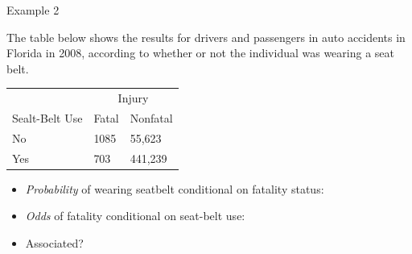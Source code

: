 \documentclass{beamer}
\begin{document}
\begin{frame}{Example 2}

{\scriptsize The table below shows the results for drivers and passengers in auto accidents in Florida in 2008, according to whether or not the individual was wearing a seat belt.}

\begin{center}
\begin{tabular}{|p{3cm}|p{3cm}|p{3cm}|}
\hline
 & \multicolumn{2}{c|}{Injury}      \\ \cline{2-3}
  Sealt-Belt Use   & Fatal & Nonfatal      \\ \hline
  No  & 1085  & 55,623   \\ \hline
  Yes & 703   & 441,239  \\ \hline
\end{tabular}
\end{center}

\begin{itemize}
\item \textit{Probability} of wearing seatbelt conditional on fatality status:
\item \textit{Odds} of fatality conditional on seat-belt use: 
\item Associated?
\end{itemize}
\end{frame}
\end{document}
